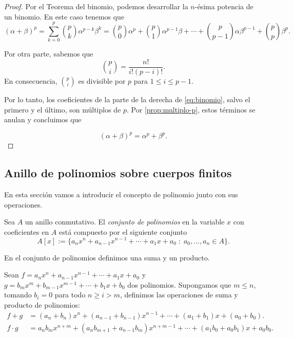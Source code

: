 \begin{proof}
    Por el Teorema del binomio, podemos desarrollar la $n$-ésima potencia de un binomio. En este caso tenemos que
    \begin{equation}
        \label{eq:binomio}
        ( \alpha + \beta )^p
            =\sum_{k=0}^p {p \choose k}\alpha^{p-k} \beta^k
            ={p \choose 0}\alpha^p + {p\choose 1} \alpha^{p-1} \beta + \cdots + {p\choose p-1}\alpha \beta^{p-1} + {p \choose p} \beta^p.
    \end{equation}

    Por otra parte, sabemos que
    \[
        {p \choose i} = \frac{n!}{i! (p-i)!}. 
    \]
    En consecuencia, ${p \choose i}$ es divisible por $p$ para $1 \leq i \leq p-1$.

    Por lo tanto, los coeficientes de la parte de la derecha de \eqref{eq:binomio}, salvo el primero y el último, son múltiplos de $p$. Por \ref{prop:multiplo-p}, estos términos se anulan y concluimos que

    \begin{equation*}
        ( \alpha + \beta )^p = \alpha^p + \beta^p.
    \end{equation*}
\end{proof}

\subsection{Anillo de polinomios sobre cuerpos finitos}

En esta sección vamos a introducir el concepto de polinomio junto con sus operaciones.

\begin{definition}
    Sea $A$ un anillo conmutativo. El \emph{conjunto de polinomios} en la variable $x$ con coeficientes en $A$ está compuesto por el siguiente conjunto
    \[
        A[x] := \{ a_n x^n  + a_{n-1} x^{n-1} + \cdots + a_1 x + a_0 \; : \; a_0, ..., a_n \in A \}. 
    \]
\end{definition}

En el conjunto de polinomios definimos una suma y un producto. 

Sean $f = a_n x^n + a_{n-1} x^{n-1} + \cdots + a_1 x + a_0$ y $g = b_m x^m + b_{m-1} x^{m-1} + \cdots + b_1 x + b_0$ dos polinomios. Supongamos que $m \leq n$, tomando $b_i = 0$ para todo $n \geq i > m$, definimos las operaciones de suma y producto de polinomios:
\begin{align*}
    f + g       &= (a_n + b_n)x^n + (a_{n-1} + b_{n-1})x^{n-1} + \cdots + (a_1 + b_1)x + (a_0 + b_0).\\
    f \cdot g   &= a_n b_m x^{n+m} + (a_n b_{m+1} + a_{n-1} b_m) x^{n+m-1} + \cdots + (a_1 b_0 + a_0 b_1)x + a_0 b_0.
\end{align*} 

